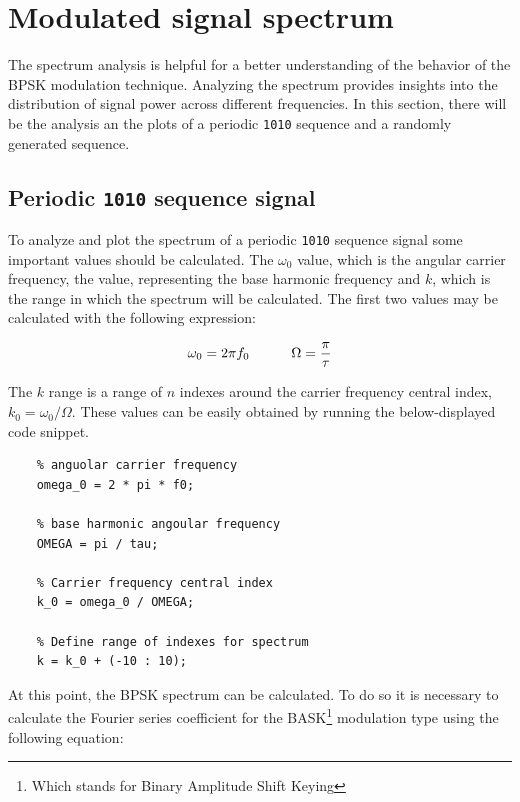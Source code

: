 \vspace{40px} \section{Modulated signal spectrum}
The spectrum analysis is helpful for a better understanding of the behavior of the BPSK modulation technique. Analyzing the spectrum provides insights into the distribution of signal power across different frequencies. In this section, there will be the analysis an the plots of a periodic \texttt{1010} sequence and a randomly generated sequence.



\subsection{Periodic \texttt{1010} sequence signal}
To analyze and plot the spectrum of a periodic \texttt{1010} sequence signal some important values should be calculated. The $\omega_0$ value, which is the angular carrier frequency, the value, representing the base harmonic frequency and $k$, which is the range in which the spectrum will be calculated. The first two values may be calculated with the following expression:

\begin{equation*}
    \omega_0 = 2\pi f_0 \hspace{30px} \Omega = \frac{\pi}{\tau}
\end{equation*}

\noindent The $k$ range is a range of $n$ indexes around the carrier frequency central index, $k_0 = \omega_0 / \Omega$. These values can be easily obtained by running the below-displayed code snippet.

\begin{lstlisting}
    % anguolar carrier frequency
    omega_0 = 2 * pi * f0; 

    % base harmonic angoular frequency 
    OMEGA = pi / tau; 

    % Carrier frequency central index
    k_0 = omega_0 / OMEGA;

    % Define range of indexes for spectrum
    k = k_0 + (-10 : 10);
\end{lstlisting}

\noindent At this point, the BPSK spectrum can be calculated. To do so it is necessary to calculate the Fourier series coefficient for the BASK\footnote{Which stands for Binary Amplitude Shift Keying} modulation type using the following equation:

